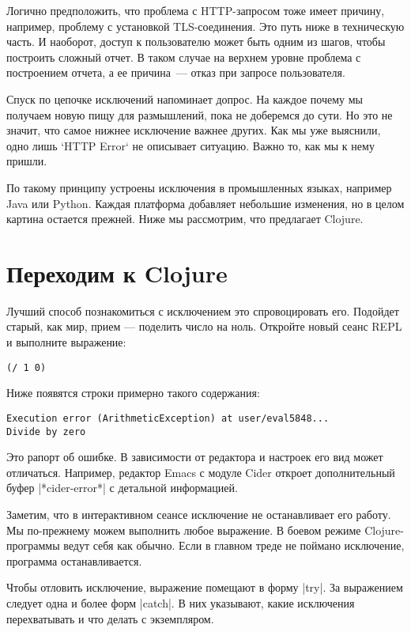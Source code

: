 Логично предположить, что проблема с HTTP-запросом тоже имеет причину, например,
проблему с установкой TLS-соединения. Это путь ниже в техническую часть. И
наоборот, доступ к пользователю может быть одним из шагов, чтобы построить
сложный отчет. В таком случае на верхнем уровне проблема с построением отчета, а
ее причина~--- отказ при запросе пользователя.

Спуск по цепочке исключений напоминает допрос. На каждое почему мы получаем
новую пищу для размышлений, пока не доберемся до сути. Но это не значит, что
самое нижнее исключение важнее других. Как мы уже выяснили, одно лишь `HTTP
Error` не описывает ситуацию. Важно то, как мы к нему пришли.

По такому принципу устроены исключения в промышленных языках, например Java или
Python. Каждая платформа добавляет небольшие изменения, но в целом картина
остается прежней. Ниже мы рассмотрим, что предлагает Clojure.

\section{Переходим к Clojure}

Лучший способ познакомиться с исключением это спровоцировать его. Подойдет
старый, как мир, прием — поделить число на ноль. Откройте новый сеанс REPL и
выполните выражение:

\begin{verbatim}
(/ 1 0)
\end{verbatim}

Ниже появятся строки примерно такого содержания:

\begin{verbatim}
Execution error (ArithmeticException) at user/eval5848...
Divide by zero
\end{verbatim}

Это рапорт об ошибке. В зависимости от редактора и настроек его вид может
отличаться. Например, редактор Emacs с модуле Cider откроет дополнительный буфер
\spverb|*cider-error*| с детальной информацией.

Заметим, что в интерактивном сеансе исключение не останавливает его работу. Мы
по-прежнему можем выполнить любое выражение. В боевом режиме Clojure-программы
ведут себя как обычно. Если в главном треде не поймано исключение, программа
останавливается.

Чтобы отловить исключение, выражение помещают в форму \spverb|try|. За выражением
следует одна и более форм \spverb|catch|. В них указывают, какие исключения
перехватывать и что делать с экземпляром.

